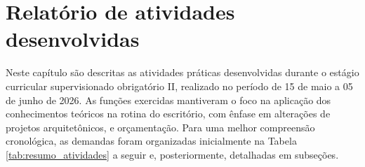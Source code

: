 \chapter[RELATÓRIO DE ATIVIDADES DESENVOLVIDAS]{Relatório de atividades desenvolvidas}

Neste capítulo são descritas as atividades práticas desenvolvidas durante o estágio curricular supervisionado obrigatório II, realizado no período de 15 de maio a 05 de junho de 2026. As funções exercidas mantiveram o foco na aplicação dos conhecimentos teóricos na rotina do escritório, com ênfase em alterações de projetos arquitetônicos, e orçamentação. Para uma melhor compreensão cronológica, as demandas foram organizadas inicialmente na Tabela \ref{tab:resumo_atividades} a seguir e, posteriormente, detalhadas em subseções.



